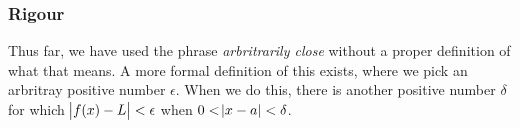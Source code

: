 \documentclass[12pt]{report}
\begin{document}
\begin{flushleft}
\subsubsection*{Rigour}
Thus far, we have used the phrase \textit{arbritrarily close} without a proper
definition of what that means. A more formal definition of this exists, where
we pick an arbritray positive number \(\epsilon\). When we do this, there is
another positive number \(\delta\) for which \(\abs{f(x) - L} < \epsilon\) when
\(0 < \abs{x - a} < \delta\).

\end{flushleft}
\end{document}
